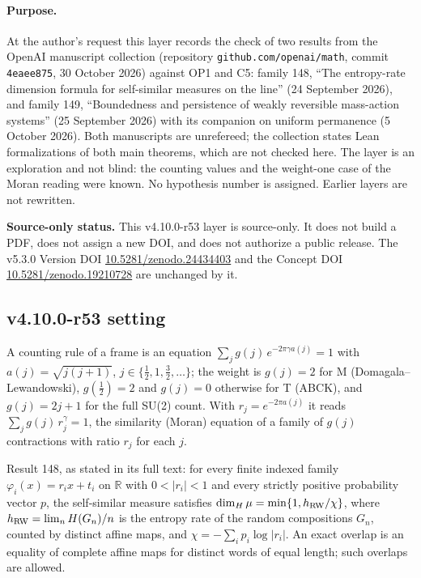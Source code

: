 \paragraph{Purpose.}
At the author's request this layer records the check of two results from the OpenAI manuscript collection (repository
\texttt{github.com/openai/math}, commit \texttt{4eaee875}, 30 October 2026) against OP1 and C5: family 148, ``The entropy-rate dimension formula for
self-similar measures on the line'' (24 September 2026), and family 149, ``Boundedness and persistence of weakly reversible mass-action systems''
(25 September 2026) with its companion on uniform permanence (5 October 2026).  Both manuscripts are unrefereed; the collection states Lean
formalizations of both main theorems, which are not checked here.  The layer is an exploration and not blind: the counting values and the
weight-one case of the Moran reading were known.  No hypothesis number is assigned.  Earlier layers are not rewritten.

\noindent\textbf{Source-only status.}
This v4.10.0-r53 layer is source-only.  It does not build a PDF, does not assign a new DOI,
and does not authorize a public release.  The v5.3.0 Version DOI
\href{https://doi.org/10.5281/zenodo.24434403}{10.5281/zenodo.24434403} and the Concept DOI
\href{https://doi.org/10.5281/zenodo.19210728}{10.5281/zenodo.19210728} are unchanged by it.

\subsection*{v4.10.0-r53 setting}
\label{subsec:v4100-r53-setting}

A counting rule of a frame is an equation \(\sum_j g(j)\,e^{-2\pi\gamma a(j)}=1\) with \(a(j)=\sqrt{j(j+1)}\), \(j\in\{\tfrac12,1,\tfrac32,\dots\}\); the weight is
\(g(j)=2\) for M (Domagala--Lewandowski), \(g(\tfrac12)=2\) and \(g(j)=0\) otherwise for T (ABCK), and \(g(j)=2j+1\) for the full SU(2) count.  With
\(r_j=e^{-2\pi a(j)}\) it reads \(\sum_j g(j)\,r_j^{\gamma}=1\), the similarity (Moran) equation of a family of \(g(j)\) contractions with ratio \(r_j\) for each \(j\).

Result 148, as stated in its full text: for every finite indexed family \(\varphi_i(x)=r_ix+t_i\) on \(\mathbb R\) with \(0<|r_i|<1\) and every strictly
positive probability vector \(p\), the self-similar measure satisfies \(\dim_H\mu=\min\{1,h_{\rm RW}/\chi\}\), where \(h_{\rm RW}=\lim_n H(G_n)/n\) is the entropy
rate of the random compositions \(G_n\), counted by distinct affine maps, and \(\chi=-\sum_ip_i\log|r_i|\).  An exact overlap is an equality of complete
affine maps for distinct words of equal length; such overlaps are allowed.

